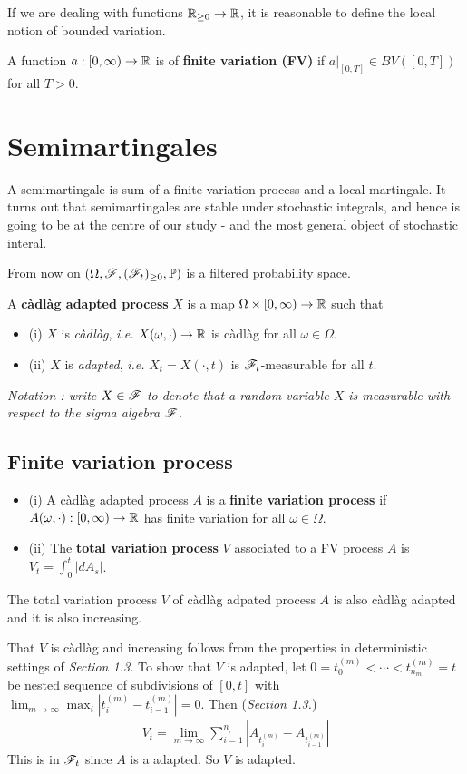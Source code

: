 \documentclass[12pt,a4paper]{article}
\newenvironment{proof}
{\begin{changemargin}{0.5cm}{0.5cm} 
	}%
	{\end{changemargin}
}
\renewenvironment{i}
{\begin{itemize} 
	}%
	{\end{itemize}
}
\begin{document}
If we are dealing with functions $\mathbb{R}_{\geq 0} \rightarrow \mathbb{R}$, it is reasonable to define the local notion of bounded variation.
\s

 A function $a:[0,\infty)\rightarrow \mathbb{R}$ is of \textbf{finite variation (FV)} if $a|_{[0,T]} \in BV([0,T])$ for all $T>0$.

\section{Semimartingales}

A semimartingale is sum of a finite variation process and a local martingale. It turns out that semimartingales are stable under stochastic integrals, and hence is going to be at the centre of our study - and the most general object of stochastic interal.
\s

From now on $(\Omega, \mathscr{F}, (\mathscr{F}_t)_{\geq 0}, \mathbb{P})$ is a filtered probability space.
\s

 A \textbf{c\`adl\`ag adapted process} $X$ is a map $\Omega \times[0,\infty) \rightarrow \mathbb{R}$ such that
\begin{i}
\item[(i)] $X$ is \emph{c\`adl\`ag}, \textit{i.e.} $X(\omega, \cdot)\rightarrow \mathbb{R}$ is c\`adl\`ag for all $\omega \in \Omega$.
\item[(ii)] $X$ is \emph{adapted}, \textit{i.e.} $X_t = X(\cdot,t)$ is $\mathscr{F}_t$-measurable for all $t$.
\end{i}
\textit{Notation : write $X\in \mathscr{F}$ to denote that a random variable $X$ is measurable with respect to the sigma algebra $\mathscr{F}$}.

\subsection{Finite variation process}

 \begin{i}
\item[(i)] A c\`adl\`ag adapted process $A$ is a \textbf{finite variation process} if $A(\omega, \cdot) : [0,\infty) \rightarrow \mathbb{R}$ has finite variation for all $\omega \in \Omega$.
\item[(ii)] The \textbf{total variation process} $V$ associated to a FV process $A$ is $V_t = \int_0^t |dA_s|$. 
\end{i}
\s

\fact The total variation process $V$ of c\`adl\`ag adpated process $A$ is also c\`adl\`ag adapted and it is also increasing.
\begin{proof}
\pf That $V$ is c\`adl\`ag and increasing follows from the properties in deterministic settings of \emph{Section 1.3.} To show that $V$ is adapted, let $0 = t_0^{(m)} < \cdots < t_{n_m}^{(m)} = t$ be nested sequence of subdivisions of $[0,t]$ with $\lim_{m\rightarrow \infty} \max_i |t_i^{(m)} - t_{i-1}^{(m)}| =0$. Then (\emph{Section 1.3.})
\begin{align*}
V_t = \lim_{m\rightarrow \infty} \sum_{i=1}^{n_,} |A_{t_i^{(m)}} - A_{t_{i-1}^{(m)}}|
\end{align*}
This is in $\mathscr{F}_t$ since $A$ is a adapted. So $V$ is adapted.

\eop
\end{proof}
\s
\end{document}
